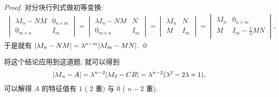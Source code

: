 \begin{exercise}[series=exer]
\begin{answer}
\begin{lemma}
      \end{lemma}
      \begin{proof}
          对分块行列式做初等变换:
          \begin{align*}
              \begin{vmatrix}
                  \lambda I_{n} - NM & 0_{n \times m} \\ 0_{m \times n} & I_{m}
              \end{vmatrix}
              =
              \begin{vmatrix}
                  \lambda I_{n} - NM & N \\ 0_{m \times n} & I_{m}
              \end{vmatrix}
              =
              \begin{vmatrix}
                  \lambda I_{n} & N \\ M & I_{m}
              \end{vmatrix}
              =
              \begin{vmatrix}
                  \lambda I_{n} & 0_{n \times m} \\ M & I_{m} - \frac{1}{\lambda} MN
              \end{vmatrix},
          \end{align*}
          于是就有 $ \abs{\lambda I_{n} - NM} = \lambda^{n - m}\abs{\lambda I_{m} - MN} $. \qed
      \end{proof}

      将这个结论应用到这道题, 就可以得到
      \begin{align*}
          \abs{\lambda I_{n} - A} = \lambda^{n - 2}\abs{\lambda I_{2} - CB} = \lambda^{n - 2}(\lambda^{2} - 2\lambda + 1),
      \end{align*}
      可以解得 $ A $ 的特征值有 $ 1 $ ( $ 2 $ 重) 与 $ 0 $ ( $ n - 2 $ 重).


\end{answer}
\end{exercise}
